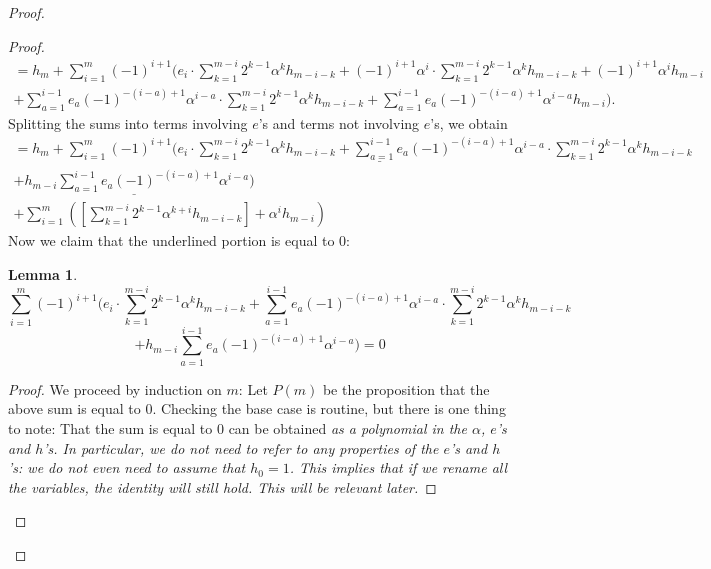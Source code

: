 \documentclass[11pt]{article}
\theoremstyle{plain}
\newtheorem{lemma}[fact]{Lemma}
\theoremstyle{definition}
\theoremstyle{definition}
\begin{document}
\begin{proof}
\begin{proof}
\begin{gather*}
= h_m+ \sum_{i=1}^m(-1)^{i+1}\Bigg(e_i \cdot \sum_{k=1}^{m-i}2^{k-1}\alpha^kh_{m-i-k} + (-1)^{i+1}\alpha^i\cdot \sum_{k=1}^{m-i}2^{k-1}\alpha^kh_{m-i-k} + (-1)^{i+1}\alpha^i h_{m-i} \\
+ \sum_{a=1}^{i-1}e_a (-1)^{-(i-a)+1}\alpha^{i-a}\cdot \sum_{k=1}^{m-i}2^{k-1}\alpha^kh_{m-i-k} + \sum_{a=1}^{i-1}e_a(-1)^{-(i-a)+1}\alpha^{i-a}h_{m-i}\Bigg).
\end{gather*}
Splitting the sums into terms involving $e$'s and terms not involving $e$'s, we obtain
\begin{gather*}
= h_m+ \underline{\sum_{i=1}^m(-1)^{i+1}\Bigg(e_i \cdot \sum_{k=1}^{m-i}2^{k-1}\alpha^kh_{m-i-k} + \sum_{a=1}^{i-1}e_a (-1)^{-(i-a)+1}\alpha^{i-a}\cdot \sum_{k=1}^{m-i}2^{k-1}\alpha^kh_{m-i-k}} \\
\underline{+h_{m-i}\sum_{a=1}^{i-1}e_a(-1)^{-(i-a)+1}\alpha^{i-a}\Bigg)}\\
+\sum_{i=1}^m\left(\left[\sum_{k=1}^{m-i}2^{k-1}\alpha^{k+i}h_{m-i-k}\right]+\alpha^ih_{m-i}\right)
\end{gather*}
Now we claim that the underlined portion is equal to 0:

\begin{lemma}\label{sum=0}
$$
\sum_{i=1}^m(-1)^{i+1}\Bigg(e_i \cdot \sum_{k=1}^{m-i}2^{k-1}\alpha^kh_{m-i-k} + \sum_{a=1}^{i-1}e_a (-1)^{-(i-a)+1}\alpha^{i-a}\cdot \sum_{k=1}^{m-i}2^{k-1}\alpha^kh_{m-i-k}
$$
$$
+h_{m-i}\sum_{a=1}^{i-1}e_a(-1)^{-(i-a)+1}\alpha^{i-a}\Bigg)=0
$$
\end{lemma}

\begin{proof}
We proceed by induction on $m$: Let $P(m)$ be the proposition that the above sum is equal to 0. Checking the base case is routine, but there is one thing to note: That the sum is equal to 0 can be obtained \textit{as a polynomial in the $\alpha$, $e$'s and $h$'s. In particular, we do not need to refer to any properties of the $e$'s and $h$'s: we do not even need to assume that $h_0=1$. This implies that if we rename all the variables, the identity will still hold. This will be relevant later.}


\end{proof}
\end{proof}
\end{proof}
\end{document}
